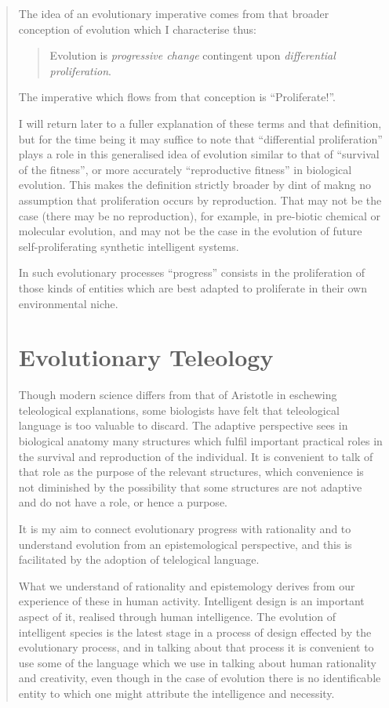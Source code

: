 {\begin{quote}
The idea of an evolutionary imperative comes from that broader conception of evolution which I characterise thus:

\begin{quote}
Evolution is \emph{progressive change} contingent upon \emph{differential proliferation}.
\end{quote}

The imperative which flows from that conception is ``Proliferate!''.

I will return later to a fuller explanation of these terms and that definition, but for the time being it may suffice to note that ``differential proliferation'' plays a role in this generalised idea of evolution similar to that of ``survival of the fitness'', or more accurately ``reproductive fitness'' in biological evolution.
This makes the definition strictly broader by dint of makng no assumption that proliferation occurs by reproduction.
That may not be the case (there may be no reproduction), for example, in pre-biotic chemical or molecular evolution, and may not be the case in the evolution of future self-proliferating synthetic intelligent systems.

In such evolutionary processes ``progress'' consists in the proliferation of those kinds of entities which are best adapted to proliferate in their own environmental niche.

\section{Evolutionary Teleology}

Though modern science differs from that of Aristotle in eschewing teleological explanations, some biologists have felt that teleological language is too valuable to discard.
The adaptive perspective sees in biological anatomy many structures which fulfil important practical roles in the survival and reproduction of the individual.
It is convenient to talk of that role as the purpose of the relevant structures, which convenience is not diminished by the possibility that some structures are not adaptive and do not have a role, or hence a purpose.

It is my aim to connect evolutionary progress with rationality and to understand evolution from an epistemological perspective, and this is facilitated by the adoption of telelogical language.

What we understand of rationality and epistemology derives from our experience of these in human activity.
Intelligent design is an important aspect of it, realised through human intelligence.
The evolution of intelligent species is the latest stage in a process of design effected by the evolutionary process, and in talking about that process it is convenient to use some of the language which we use in talking about human rationality and creativity, even though in the case of evolution there is no identificable entity to which one might attribute the intelligence and necessity.


\end{quote}}
